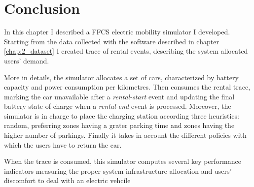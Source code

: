 \section{Conclusion}\label{key}

In this chapter I described a FFCS electric mobility simulator I developed. Starting from the data collected with the software described in chapter \ref{chap:2_dataset} I created trace of rental events, describing the system allocated users' demand. 

More in details, the simulator allocates a set of cars, characterized by battery capacity and power consumption per kilometres. Then consumes the rental trace, marking the car unavailable after a \textit{rental-start} event and updating the final battery state of charge when a \textit{rental-end} event is processed. Moreover, the simulator is in charge to place the charging station according three heuristics: random, preferring zones having a grater parking time and zones having the higher number of parkings. Finally it takes in account the different policies with which the users have to return the car.

When the trace is consumed, this simulator computes several key performance indicators measuring the proper system infrastructure allocation and users' discomfort to deal with an electric vehcile